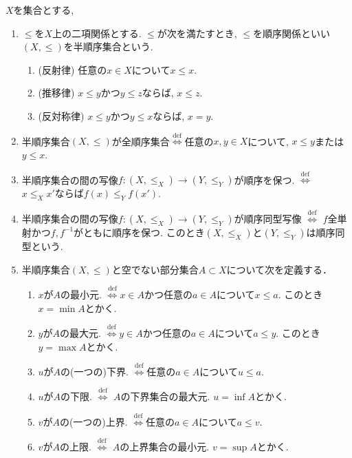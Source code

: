 \documentclass[dvipdfmx,a4paper,11pt]{article}
\theoremstyle{definition}
\begin{document}
 \begin{tcolorbox}[
    colback = white,
    colframe = black!35!black,
    fonttitle = \bfseries,
    breakable = true]
    $X$を集合とする,
    \begin{enumerate}
    \setlength{\parskip}{0cm} 
  \setlength{\itemsep}{0cm} 
   \item $\le$を$X$上の二項関係とする. $\le$が次を満たすとき, $\le$を順序関係といい$(X, \le)$を半順序集合という.
       \begin{enumerate}[label=(\arabic*).]
 \setlength{\parskip}{0cm}
  \setlength{\itemsep}{0pt}
  \item (反射律) 任意の$x \in X$について$x \le x$.
  \item (推移律) $x \le y$かつ$y \le z$ならば, $x \le z$.
  \item (反対称律) $x \le y$かつ$y \le x$ならば, $x=y$.
  \end{enumerate}
  \item 半順序集合$(X, \le)$が全順序集合$\stackrel{\mathrm{def}}{\Longleftrightarrow}$任意の$x,y \in X$について, $x \le y$または$y \le x$.
  \item 半順序集合の間の写像$f : (X, \le_X) \to (Y, \le_Y)$が順序を保つ. 
  $\stackrel{\mathrm{def}}{\Longleftrightarrow}$　$x \le_X x'$ならば$f(x) \le_Y f(x')$.
  \item 半順序集合の間の写像$f : (X, \le_X) \to (Y, \le_Y)$が順序同型写像 $\stackrel{\mathrm{def}}{\Longleftrightarrow}$
  $f$全単射かつ$f, f^{-1}$がともに順序を保つ. このとき$ (X, \le_X)$と$ (Y, \le_Y)$は順序同型という.
    \item 半順序集合$(X, \le)$と空でない部分集合$A \subset X$について次を定義する．
      \begin{enumerate}[label=(\arabic*).]
 \setlength{\parskip}{0cm}
  \setlength{\itemsep}{0pt}
  \item $x$が$A$の最小元. $\stackrel{\mathrm{def}}{\Longleftrightarrow}$$x \in A$かつ任意の$a \in A$について$x \le a$. このとき$x = \min A$とかく.
  \item $y$が$A$の最大元. $\stackrel{\mathrm{def}}{\Longleftrightarrow}$$y \in A$かつ任意の$a \in A$について$a \le y$. このとき$y = \max A$とかく.
  \item $u$が$A$の(一つの)下界. $\stackrel{\mathrm{def}}{\Longleftrightarrow}$任意の$a \in A$について$u \le a$. 
  \item $u$が$A$の下限. $\stackrel{\mathrm{def}}{\Longleftrightarrow}$ $A$の下界集合の最大元. $u = \inf A$とかく.
  \item $v$が$A$の(一つの)上界. $\stackrel{\mathrm{def}}{\Longleftrightarrow}$任意の$a \in A$について$a \le v$. 
  \item $v$が$A$の上限. $\stackrel{\mathrm{def}}{\Longleftrightarrow}$ $A$の上界集合の最小元. $v = \sup A$とかく.
  \end{enumerate}
        \end{enumerate}
 \end{tcolorbox}
\end{document}
